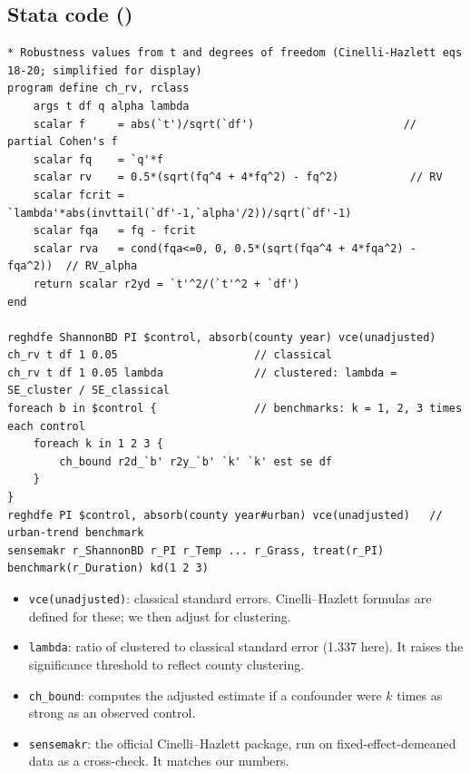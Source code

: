 \documentclass[11pt]{article}
\begin{document}
\subsection*{Stata code ()}
\begin{lstlisting}
* Robustness values from t and degrees of freedom (Cinelli-Hazlett eqs 18-20; simplified for display)
program define ch_rv, rclass
    args t df q alpha lambda
    scalar f     = abs(`t')/sqrt(`df')                       // partial Cohen's f
    scalar fq    = `q'*f
    scalar rv    = 0.5*(sqrt(fq^4 + 4*fq^2) - fq^2)           // RV
    scalar fcrit = `lambda'*abs(invttail(`df'-1,`alpha'/2))/sqrt(`df'-1)
    scalar fqa   = fq - fcrit
    scalar rva   = cond(fqa<=0, 0, 0.5*(sqrt(fqa^4 + 4*fqa^2) - fqa^2))  // RV_alpha
    return scalar r2yd = `t'^2/(`t'^2 + `df')
end

reghdfe ShannonBD PI $control, absorb(county year) vce(unadjusted)
ch_rv t df 1 0.05                     // classical
ch_rv t df 1 0.05 lambda              // clustered: lambda = SE_cluster / SE_classical
foreach b in $control {               // benchmarks: k = 1, 2, 3 times each control
    foreach k in 1 2 3 {
        ch_bound r2d_`b' r2y_`b' `k' `k' est se df
    }
}
reghdfe PI $control, absorb(county year#urban) vce(unadjusted)   // urban-trend benchmark
sensemakr r_ShannonBD r_PI r_Temp ... r_Grass, treat(r_PI) benchmark(r_Duration) kd(1 2 3)
\end{lstlisting}
\begin{itemize}
\item \texttt{vce(unadjusted)}: classical standard errors. Cinelli--Hazlett formulas are defined for these; we then adjust for clustering.
\item \texttt{lambda}: ratio of clustered to classical standard error (1.337 here). It raises the significance threshold to reflect county clustering.
\item \texttt{ch\_bound}: computes the adjusted estimate if a confounder were $k$ times as strong as an observed control.
\item \texttt{sensemakr}: the official Cinelli--Hazlett package, run on fixed-effect-demeaned data as a cross-check. It matches our numbers.
\end{itemize}
\end{document}
